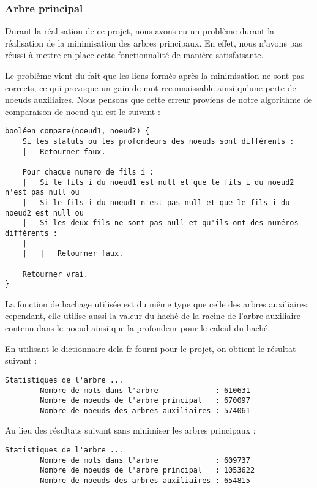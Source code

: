\documentclass[15pt, a4paper]{article}
\begin{document}
\subsubsection{Arbre principal}

Durant la réalisation de ce projet, nous avons eu un problème durant la 
réalisation de la minimisation des arbres principaux. En effet, nous n'avons pas
réussi à mettre en place cette fonctionnalité de manière satisfaisante.

Le problème vient du fait que les liens formés après la minimisation ne sont pas 
corrects, ce qui provoque un gain de mot reconnaissable ainsi qu'une perte de noeuds
auxiliaires. Nous pensons que cette erreur proviens de notre algorithme de 
comparaison de noeud qui est le suivant :

\begin{verbatim}
booléen compare(noeud1, noeud2) {
    Si les statuts ou les profondeurs des noeuds sont différents :
    |   Retourner faux.

    Pour chaque numero de fils i :
    |   Si le fils i du noeud1 est null et que le fils i du noeud2 n'est pas null ou
    |   Si le fils i du noeud1 n'est pas null et que le fils i du noeud2 est null ou
    |   Si les deux fils ne sont pas null et qu'ils ont des numéros différents :
    |
    |   |   Retourner faux.

    Retourner vrai.
}
\end{verbatim}

La fonction de hachage utilisée est du même type que celle des arbres auxiliaires, 
cependant, elle utilise aussi la valeur du haché de la racine de l'arbre auxiliaire
contenu dans le noeud ainsi que la profondeur pour le calcul du haché. 

\bigskip

\noindent En utilisant le dictionnaire dela-fr fourni pour le projet, on 
obtient le résultat suivant :

\begin{verbatim}
Statistiques de l'arbre ...
        Nombre de mots dans l'arbre             : 610631
        Nombre de noeuds de l'arbre principal   : 670097
        Nombre de noeuds des arbres auxiliaires : 574061
\end{verbatim}

\noindent Au lieu des résultats suivant sans minimiser les arbres principaux :

\begin{verbatim}
Statistiques de l'arbre ...
        Nombre de mots dans l'arbre             : 609737
        Nombre de noeuds de l'arbre principal   : 1053622
        Nombre de noeuds des arbres auxiliaires : 654815
\end{verbatim}
\end{document}
